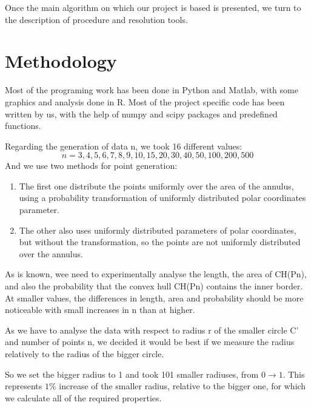 \documentclass[12pt,a4paper]{article}
\begin{document}
Once the main algorithm on which our project is based is presented, we turn to the description of procedure and resolution tools.

\section*{Methodology}
Most of the programing work has been done in Python and Matlab, with some graphics and analysis done in R. Most of the project specific code has been written by us, with the help of numpy and scipy packages and predefined functions. \medskip

Regarding the generation of data n, we took 16 different values: $$n= 3,4,5,6,7,8,9,10,15,20,30,40,50,100,200,500$$
And we use two methods for point generation:
\begin{enumerate}
 \item The first one distribute the points uniformly over the area of the annulus, using a probability transformation of uniformly distributed polar coordinates parameter.
 \item The other also uses uniformly distributed parameters of polar coordinates, but without the transformation, so the points are not uniformly distributed over the annulus.
 \end{enumerate} 

As is known, wee need to experimentally analyse the length, the area of CH(Pn), and also the probability that the convex hull CH(Pn) contains the inner border.
At smaller values, the differences in length, area and probability should be more noticeable with small increases in n than at higher.\medskip

 
As we have to analyse the data with respect to radius r of the smaller circle C’ and number of points n, we decided it would be best if we measure the radius relatively to the radius of the bigger circle. 
 
So we set the bigger radius to 1 and took 101 smaller radiuses, from $0\to 1$. This represents $1\%$ increase of the smaller radius, relative to the bigger one, for which we calculate all of the required properties. \medskip
\end{document}
